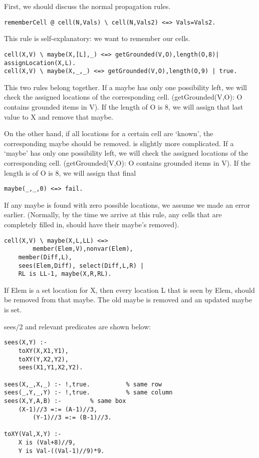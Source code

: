 First, we should discuss the normal propagation rules.

\begin{lstlisting}
rememberCell @ cell(N,Vals) \ cell(N,Vals2) <=> Vals=Vals2. 
\end{lstlisting}

This rule is self-explanatory: we want to remember our cells.
\begin{lstlisting}
cell(X,V) \ maybe(X,[L],_) <=> getGrounded(V,O),length(O,8)| assignLocation(X,L).
cell(X,V) \ maybe(X,_,_) <=> getGrounded(V,O),length(O,9) | true.
\end{lstlisting}

This two rules belong together. If a maybe has only one possibility left, we will check the assigned locations of the corresponding cell. (getGrounded(V,O): O contains grounded items in V). If the length of O is 8, we will assign that last value to X and remove that maybe.

On the other hand, if all locations for a certain cell are `known', the corresponding maybe should be removed.
is slightly more complicated. If a `maybe' has only one possibility left, we will check the assigned locations of the corresponding cell. (getGrounded(V,O): O contains grounded items in V). If the length is of O is 8, we will assign that final

\begin{lstlisting}
maybe(_,_,0) <=> fail.  
\end{lstlisting}


If any maybe is found with zero possible locations, we assume we made an error earlier. (Normally, by the time we arrive at this rule, any cells that are completely filled in, should have their maybe's removed).

\begin{lstlisting}
cell(X,V) \ maybe(X,L,LL) <=>
        member(Elem,V),nonvar(Elem),
	member(Diff,L),
	sees(Elem,Diff), select(Diff,L,R) |
	RL is LL-1, maybe(X,R,RL). 
\end{lstlisting}

If Elem is a set location for X, then every location L that is seen by Elem, should be removed from that maybe. The old maybe is removed and an updated maybe is set.

sees/2 and relevant predicates are shown below:
\begin{lstlisting}
sees(X,Y) :-
	toXY(X,X1,Y1),
	toXY(Y,X2,Y2),
	sees(X1,Y1,X2,Y2).

sees(X,_,X,_) :- !,true.          % same row
sees(_,Y,_,Y) :- !,true.          % same column
sees(X,Y,A,B) :-        % same box
	(X-1)//3 =:= (A-1)//3,
        (Y-1)//3 =:= (B-1)//3.

toXY(Val,X,Y) :-
	X is (Val+8)//9,
	Y is Val-((Val-1)//9)*9.
\end{lstlisting}


